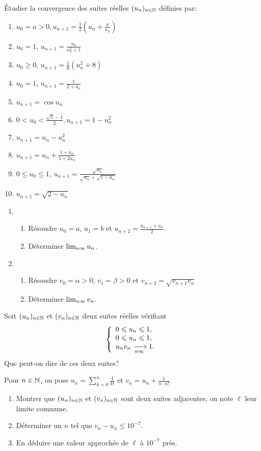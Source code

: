 \documentclass{yann}
\newcommand\U{(u_n)_{n\in\N}}
\newcommand\V{(v_n)_{n\in\N}}
\begin{document}
\Exercice

Étudier la convergence des suites réelles $\U$ définies par:
\begin{enumerate}
\item
$u_0 = a > 0, u_{n+1} = \frac12\left(u_n + \frac{a}{u_n}\right)$
\item
$u_0 = 1$, $u_{n+1} = \frac{u_n}{u_n^2+1}$
\item
$u_0\geq0$, $u_{n+1} = \frac16(u_n^2+8)$
\item
$u_0 = 1$, $u_{n+1} = \frac{1}{2+u_n}$
\item
$u_{n+1} = \cos u_n$
\item
$0 < u_0 < \frac{\sqrt5-1}{2}, u_{n+1} = 1 - u_n^2$
\item
$u_{n+1} = u_n - u_n^2$
\item
$u_{n+1} = u_n + \frac{1+u_n}{1+2u_n}$
\item
$0\leq u_0\leq1$, $u_{n+1} = \frac{\sqrt{u_n}}{\sqrt{u_n}+\sqrt{1-u_n}}$
\item
$u_{n+1} =\sqrt{2-u_n}$
\end{enumerate}

\Exercice
\begin{enumerate}
\item
\begin{enumerate}
\item
Résoudre $u_0 = a$, $u_1 = b$ et $u_{n+2} = \frac{u_{n+1} + u_n}{2}$.
\item
Déterminer $\lim_{n\infty} u_n$.
\end{enumerate}
\item
\begin{enumerate}
\item
Résoudre $v_0 =\alpha> 0$, $v_1 =\beta> 0$ et $v_{n+2} =\sqrt{ v_{n+1} v_n }$
\item
Déterminer $\lim_{n\infty} v_n$.
\end{enumerate}
\end{enumerate}

\Exercice

Soit $\U$ et $\V$ deux suites réelles vérifiant
\[ \left\{ \begin{array}{l}
  0\leqslant u_n\leqslant1, \\
  0\leqslant u_n\leqslant1, \\
  u_n v_n \xrightarrow[{n\infty}]{} 1.
\end{array} \right. \]
Que peut-on dire de ces deux suites?

\Exercice

Pour $n\in\mathbb{N}$, on pose
$u_n =\sum_{k=0}^n \frac{1}{k!}$ et
$v_n = u_n + \frac{1}{n\cdot n!}$.
\begin{enumerate}
\item
Montrer que $\U$ et $\V$ sont deux suites adjacentes;
  on note $\ell$ leur limite commune.
\item
Déterminer un $n$ tel que $v_n - u_n\leq10^{-7}$.
\item
En déduire une valeur approchée de $\ell$ à $10^{-7}$ près.
\end{enumerate}
\end{document}
